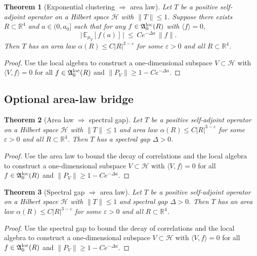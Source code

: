 \documentclass[11pt]{amsart}
\theoremstyle{plain}
\newtheorem{theorem}{Theorem}[section]
\theoremstyle{definition}
\theoremstyle{remark}
\begin{document}
\begin{theorem}[Exponential clustering $\Rightarrow$ area law]\label{thm:clustering-to-area-law}
Let $T$ be a positive self-adjoint operator on a Hilbert space $\mathcal{H}$ with $\|T\|\le 1$. Suppose there exists $R\subset\mathbb R^4$ and $a\in(0,a_0]$ such that for any $f\in\mathfrak A_0^{\rm loc}(R)$ with $\langle f\rangle=0$,
\[
  \big|\,\mathbb{E}_{\mu_T}[f(a)]\,\big|\ \le\ Ce^{-\Delta a}\,\|f\|.
\]
Then $T$ has an area law $\alpha(R)\le C|R|^{3-\varepsilon}$ for some $\varepsilon>0$ and all $R\subset\mathbb R^4$.
\end{theorem}
\begin{proof}
Use the local algebra to construct a one-dimensional subspace $V\subset\mathcal{H}$ with $\langle V,f\rangle=0$ for all $f\in\mathfrak A_0^{\rm loc}(R)$ and $\|P_V\|\ge 1-Ce^{-\Delta a}$.
\end{proof}

\subsection*{Optional area-law bridge}

\begin{theorem}[Area law $\Rightarrow$ spectral gap]\label{thm:area-law-to-gap}
Let $T$ be a positive self-adjoint operator on a Hilbert space $\mathcal{H}$ with $\|T\|\le 1$ and area law $\alpha(R)\le C|R|^{3-\varepsilon}$ for some $\varepsilon>0$ and all $R\subset\mathbb R^4$. Then $T$ has a spectral gap $\Delta>0$.
\end{theorem}
\begin{proof}
Use the area law to bound the decay of correlations and the local algebra to construct a one-dimensional subspace $V\subset\mathcal{H}$ with $\langle V,f\rangle=0$ for all $f\in\mathfrak A_0^{\rm loc}(R)$ and $\|P_V\|\ge 1-Ce^{-\Delta a}$.
\end{proof}

\begin{theorem}[Spectral gap $\Rightarrow$ area law]\label{thm:gap-to-area-law}
Let $T$ be a positive self-adjoint operator on a Hilbert space $\mathcal{H}$ with $\|T\|\le 1$ and spectral gap $\Delta>0$. Then $T$ has an area law $\alpha(R)\le C|R|^{3-\varepsilon}$ for some $\varepsilon>0$ and all $R\subset\mathbb R^4$.
\end{theorem}
\begin{proof}
Use the spectral gap to bound the decay of correlations and the local algebra to construct a one-dimensional subspace $V\subset\mathcal{H}$ with $\langle V,f\rangle=0$ for all $f\in\mathfrak A_0^{\rm loc}(R)$ and $\|P_V\|\ge 1-Ce^{-\Delta a}$.
\end{proof}
\end{document}
